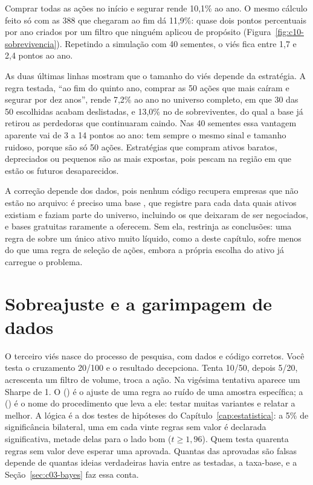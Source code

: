 
Comprar todas as ações no início e segurar rende 10,1\% ao ano. O mesmo cálculo feito só com as 388 que chegaram ao fim dá 11,9\%: quase dois pontos percentuais por ano criados por um filtro que ninguém aplicou de propósito (Figura~\ref{fig:c10-sobrevivencia}). Repetindo a simulação com 40 sementes, o viés fica entre 1,7 e 2,4 pontos ao ano.

As duas últimas linhas mostram que o tamanho do viés depende da estratégia. A regra testada, ``ao fim do quinto ano, comprar as 50 ações que mais caíram e segurar por dez anos'', rende 7,2\% ao ano no universo completo, em que 30 das 50 escolhidas acabam deslistadas, e 13,0\% no de sobreviventes, do qual a base já retirou as perdedoras que continuaram caindo. Nas 40 sementes essa vantagem aparente vai de 3 a 14 pontos ao ano: tem sempre o mesmo sinal e tamanho ruidoso, porque são só 50 ações. Estratégias que compram ativos baratos, depreciados ou pequenos são as mais expostas, pois pescam na região em que estão os futuros desaparecidos.

A correção depende dos dados, pois nenhum código recupera empresas que não estão no arquivo: é preciso uma base , que registre para cada data quais ativos existiam e faziam parte do universo, incluindo os que deixaram de ser negociados, e bases gratuitas raramente a oferecem. Sem ela, restrinja as conclusões: uma regra de  sobre um único ativo muito líquido, como a deste capítulo, sofre menos do que uma regra de seleção de ações, embora a própria escolha do ativo já carregue o problema.

\section{Sobreajuste e a garimpagem de dados}
\label{sec:c10-sobreajuste}

O terceiro viés nasce do processo de pesquisa, com dados e código corretos. Você testa o cruzamento 20/100 e o resultado decepciona. Tenta 10/50, depois 5/20, acrescenta um filtro de volume, troca a ação. Na vigésima tentativa aparece um Sharpe de 1. O  () é o ajuste de uma regra ao ruído de uma amostra específica; a  () é o nome do procedimento que leva a ele: testar muitas variantes e relatar a melhor. A lógica é a dos testes de hipóteses do Capítulo~\ref{cap:estatistica}: a 5\% de significância bilateral, uma em cada vinte regras sem valor é declarada significativa, metade delas para o lado bom ($t \ge 1,96$). Quem testa quarenta regras sem valor deve esperar uma aprovada. Quantas das aprovadas são falsas depende de quantas ideias verdadeiras havia entre as testadas, a taxa-base, e a Seção~\ref{sec:c03-bayes} faz essa conta.

